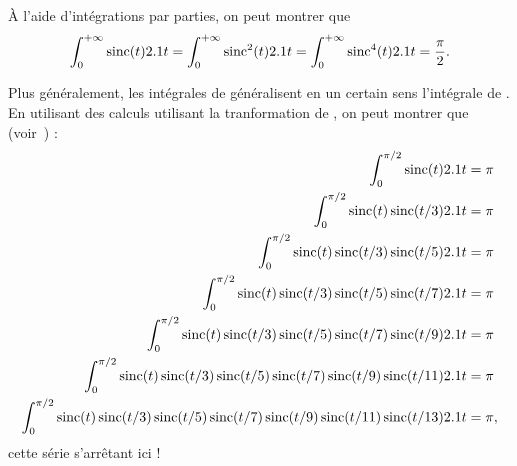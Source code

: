 À l'aide d'intégrations par parties, on peut montrer que 
\[
\int_0^{+\infty} \sinc(t) \d t
= \int_0^{+\infty} \sinc^2(t) \d t
= \int_0^{+\infty} \sinc^4(t) \d t
= \frac{\pi}{2}.
\]

Plus généralement, les intégrales de  généralisent en un certain sens l'intégrale de . En utilisant des calculs utilisant la tranformation de , on peut montrer que (voir~\cite{rioul}) :
\begin{align*}
\int_0^{\pi/2} \sinc(t) \d t &= \pi\\
\int_0^{\pi/2} \sinc(t) \sinc(t/3) \d t &= \pi\\
\int_0^{\pi/2} \sinc(t) \sinc(t/3) \sinc(t/5) \d t &= \pi\\
\int_0^{\pi/2} \sinc(t) \sinc(t/3) \sinc(t/5) \sinc(t/7) \d t &= \pi\\
\int_0^{\pi/2} \sinc(t) \sinc(t/3) \sinc(t/5) \sinc(t/7) \sinc(t/9) \d t &= \pi\\
\int_0^{\pi/2} \sinc(t) \sinc(t/3) \sinc(t/5) \sinc(t/7) \sinc(t/9) \sinc(t/11) \d t &= \pi\\
\int_0^{\pi/2} \sinc(t) \sinc(t/3) \sinc(t/5) \sinc(t/7) \sinc(t/9) \sinc(t/11) \sinc(t/13) \d t &= \pi,
\end{align*}
cette série s'arrêtant ici ! 